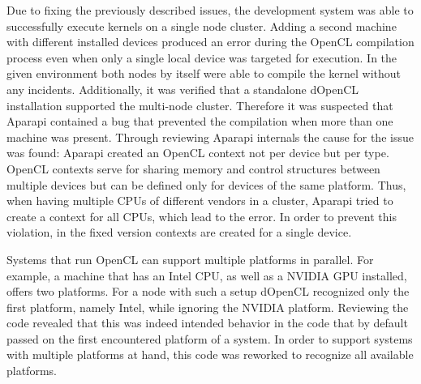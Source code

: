 \begin{description}[style=nextline]
	\item [Failed compilations when using multiple devices]
	Due to fixing the previously described issues, the development system was able to successfully execute kernels on a single node cluster. Adding a second machine with different installed devices produced an error during the OpenCL compilation process even when only a single local device was targeted for execution. In the given environment both nodes by itself were able to compile the kernel without any incidents. Additionally, it was verified that a standalone dOpenCL installation supported the multi-node cluster. Therefore it was suspected that Aparapi contained a bug that prevented the compilation when more than one machine was present. Through reviewing Aparapi internals the cause for the issue was found: Aparapi created an OpenCL context not per device but per type. OpenCL contexts serve for sharing memory and control structures between multiple devices but can be defined only for devices of the same platform. Thus, when having multiple CPUs of different vendors in a cluster, Aparapi tried to create a context for all CPUs, which lead to the error. In order to prevent this violation, in the fixed version contexts are created for a single device.

	\item [Multiple platforms per machine]
	Systems that run OpenCL can support multiple platforms in parallel. For example, a machine that has an Intel CPU, as well as a NVIDIA GPU installed, offers two platforms. For a node with such a setup dOpenCL recognized only the first platform, namely Intel, while ignoring the NVIDIA platform. Reviewing the code revealed that this was indeed intended behavior in the code that by default passed on the first encountered platform of a system. In order to support systems with multiple platforms at hand, this code was reworked to recognize all available platforms.

\end{description}


